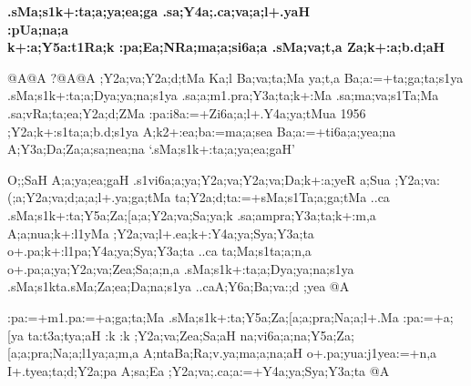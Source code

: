 \vfill

\begin{center}
{\Large\bfseries{\sktf .sMa;s1k+:ta;a;ya;ea;ga \ZF{-}
.sa;Y4a;.ca;va;a;l+.yaH}}\\
{\Large\bfseries{\sktf :pUa;na;a {}}}\\
{\large\bfseries{\sktf k+:a;Y5a:t1Ra;k \ZF{-} :pa;Ea;NRa;ma;a;si6a;a\ZF{,}
.sMa;va;t,a {}\ZF{,} Za;k+:a;b.d;aH {}}}
\end{center}

\newpage

\begin{spacing}{1.15}
{{\sktf {}@A@A ?@A@A ;Y2a;va;Y2a;d;tMa Ka;l
Ba;va;ta;Ma ya;t,a Ba;a:=+ta;ga;ta;s1ya .sMa;s1k+:ta;a;Dya;ya;na;s1ya .sa;a;m1.pra;Y3a;ta;k+:Ma
.sa;ma;va;s1Ta;Ma .sa;vRa;ta;ea;Y2a;d;ZMa :pa}{\sktf {}:i8a:=+Zi6a;a;l+.Y4a;ya;tMua 1956 ;Y2a;k+:s1ta;a;b.d;s1ya
A;k2+:ea;ba:=\ZF{-}ma;a;sea Ba;a:=+ti6a;a;yea;na A;Y3a;Da;Za;a;sa;nea;na}
`{\sktf .sMa;s1k+:ta;a;ya;ea;gaH}'}

\vskip 0.1cm

{\sktf O;;SaH A;a;ya;ea;gaH .s1vi6a;a;ya;Y2a;va;Y2a;va;Da;k+:a;yeR%
a;Sua ;Y2a;va:(;a;Y2a;va;d;a;a;l+.ya;ga;tMa
ta;Y2a;d;ta:=+sMa;s1Ta;a;ga;tMa ..ca .sMa;s1k+:ta;Y5a;Za;[a;a;Y2a;va;Sa;ya;k .sa;a}{\sktf mpra}{\sktf ;Y3a;ta;k+:m,a A;a;nua;k+:l1yMa
;Y2a;va;l+.ea;k+:Y4a;ya;Sya;Y3a;ta\ZF{,} o+.pa;k+:l1pa;Y4a;ya;Sya;Y3a;ta ..ca
ta;Ma;s1ta;a;n,a o+.pa;a;ya;Y2a;va;Zea;Sa;a;n,a .sMa;s1k+:ta;a;Dya;ya;na;s1ya .sMa;s1k}{\sktf ta}{\sktf .sMa;Za;ea;Da;na;s1ya ..ca\break A;Y6a;Ba;va:;d%
;yea @A}

\vskip 0.1cm

{\sktf :pa:=+m1.pa:=+a;ga;ta;Ma .sMa;s1k+:ta;Y5a;Za;[a;a;pra;Na;a;l+.Ma :pa:=+a;[ya
ta:t3a;tya;aH :k :k ;Y2a;va;Zea;Sa;aH
na;vi6a;a;na;Y5a;Za;[a;a;pra;Na;a;l1ya;a;m,a A{;nta}{Ba;Ra};v.ya;ma;a;na;aH o+.pa;yua:j1yea:=+n,a\ZF{,} I+.tyea;ta;d;Y2a;pa
A;sa;Ea ;Y2a;va;.ca;a:=+Y4a;ya;Sya;Y3a;ta @A}


\end{spacing}
